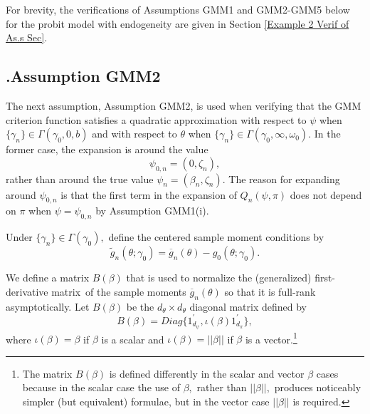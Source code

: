 \documentclass[12pt,thmsb,titlepage,final,oneside,letterpaper]{article}
\begin{document}
For brevity, the verifications of Assumptions GMM1 and GMM2-GMM5 below for
the probit model with endogeneity are given in Section \ref{Example 2 Verif
of As.s Sec}.

\subsection{\hspace{-0.23in}\textbf{.}\hspace{0.18in}Assumption GMM2}

\hspace{0.25in}The next assumption, Assumption GMM2, is used when verifying
that the GMM criterion function satisfies a quadratic approximation with
respect to $\psi $ when $\{\gamma _{n}\}\in \Gamma (\gamma _{0},0,b)$ and
with respect to $\theta $ when $\{\gamma _{n}\}\in \Gamma (\gamma
_{0},\infty ,\omega _{0}).$ In the former case, the expansion is around the
value 
\begin{equation}
\psi _{0,n}=(0,\zeta _{n}),
\end{equation}%
rather than around the true value $\psi _{n}=(\beta _{n},\zeta _{n}).$ The
reason for expanding around $\psi _{0,n}$ is that the first term in the
expansion of $Q_{n}(\psi ,\pi )$ does not depend on $\pi $ when $\psi =\psi
_{0,n}$ by Assumption GMM1(i).

Under $\{\gamma _{n}\}\in \Gamma (\gamma _{0}),$ define the centered sample
moment conditions by 
\begin{equation}
\widetilde{g}_{n}\left( \theta ;\gamma _{0}\right) =\overline{g}_{n}\left(
\theta \right) -g_{0}\left( \theta ;\gamma _{0}\right) .
\end{equation}

We define a matrix $B(\beta )$ that is used to normalize the (generalized)
first-derivative matrix\ of the sample moments $\overline{g}_{n}(\theta )$
so that it is full-rank asymptotically. Let $B(\beta )$ be the $d_{\theta
}\times d_{\theta }$ diagonal matrix defined by%
\begin{equation}
B(\beta )=Diag\{1_{d_{\psi }}^{\prime },\iota (\beta )1_{d_{\pi }}^{\prime
}\},
\end{equation}%
where $\iota (\beta )=\beta $ if $\beta $ is a scalar and $\iota (\beta
)=||\beta ||$ if $\beta $ is a vector.\footnote{%
The matrix $B(\beta )$ is defined differently in the scalar and vector $%
\beta $ cases because in the scalar case the use of $\beta ,$ rather than $%
||\beta ||,$ produces noticeably simpler (but equivalent) formulae, but in
the vector case $||\beta ||$ is required.}\medskip
\end{document}
